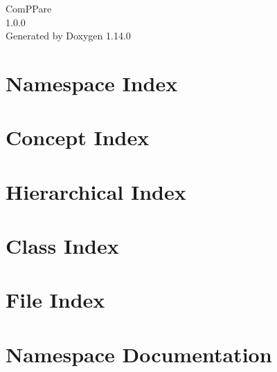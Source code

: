 \documentclass[twoside]{book}
\newcommand{\+}{\discretionary{\mbox{\scriptsize$\hookleftarrow$}}{}{}}
\newcommand{\clearemptydoublepage}{%
    \newpage{\pagestyle{empty}\cleardoublepage}%
  }
\begin{document}
  \raggedbottom
    \hypersetup{pageanchor=false,
                bookmarksnumbered=true,
                pdfencoding=unicode
               }
  \begin{titlepage}
  \vspace*{7cm}
  \begin{center}%
  {\Large Com\+PPare}\\
  [1ex]\large 1.\+0.\+0 \\
  \vspace*{1cm}
  {\large Generated by Doxygen 1.14.0}\\
  \end{center}
  \end{titlepage}
  \clearemptydoublepage
  \tableofcontents
  \clearemptydoublepage
  \hypersetup{pageanchor=true}



\chapter{Namespace Index}

\chapter{Concept Index}

\chapter{Hierarchical Index}

\chapter{Class Index}

\chapter{File Index}

\chapter{Namespace Documentation}











\end{document}
